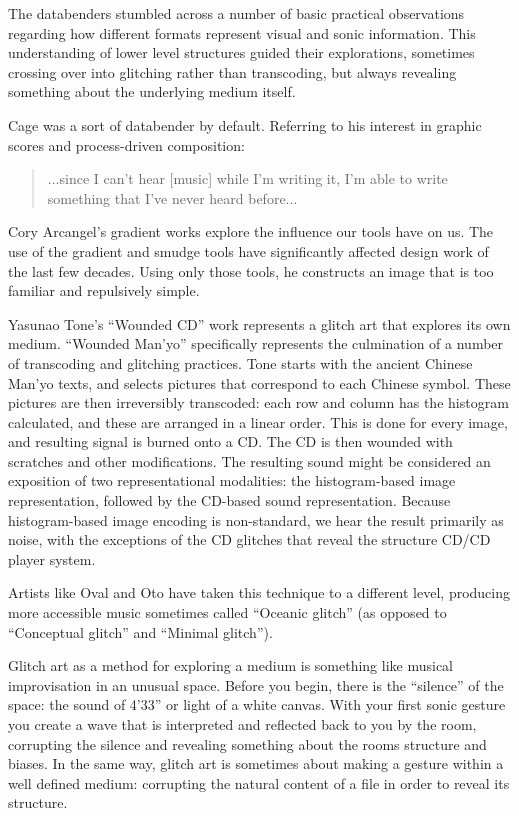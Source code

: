\documentclass{thesis}
\begin{document}
	The databenders stumbled across a number of basic practical observations regarding how different formats represent visual and sonic information. This understanding of lower level structures guided their explorations, sometimes crossing over into glitching rather than transcoding, but always revealing something about the underlying medium itself.
	
	Cage was a sort of databender by default. Referring to his interest in graphic scores and process-driven composition:

\begin{quote}
...since I can't hear [music] while I'm writing it, I'm able to write something that I've never heard before...
\end{quote}

	Cory Arcangel's gradient works\cite{cory_arcangel_photoshop_2009} explore the influence our tools have on us. The use of the gradient and smudge tools have significantly affected design work of the last few decades. Using only those tools, he constructs an image that is too familiar and repulsively simple.
	
	Yasunao Tone's ``Wounded CD''\cite{media_art_net_media_2010} work represents a glitch art that explores its own medium. ``Wounded Man'yo'' specifically represents the culmination of a number of transcoding and glitching practices. Tone starts with the ancient Chinese Man'yo texts, and selects pictures that correspond to each Chinese symbol. These pictures are then irreversibly transcoded: each row and column has the histogram calculated, and these are arranged in a linear order. This is done for every image, and resulting signal is burned onto a CD. The CD is then wounded with scratches and other modifications. The resulting sound might be considered an exposition of two representational modalities: the histogram-based image representation, followed by the CD-based sound representation. Because histogram-based image encoding is non-standard, we hear the result primarily as noise, with the exceptions of the CD glitches that reveal the structure CD/CD player system.
	
	Artists like Oval and Oto have taken this technique to a different level, producing more accessible music sometimes called ``Oceanic glitch'' (as opposed to ``Conceptual glitch'' and ``Minimal glitch'').\cite{Sangild04}
	
	Glitch art as a method for exploring a medium is something like musical improvisation in an unusual space. Before you begin, there is the ``silence'' of the space: the sound of 4'33'' or light of a white canvas. With your first sonic gesture you create a wave that is interpreted and reflected back to you by the room, corrupting the silence and revealing something about the rooms structure and biases. In the same way, glitch art is sometimes about making a gesture within a well defined medium: corrupting the natural content of a file in order to reveal its structure.
	
\end{document}
